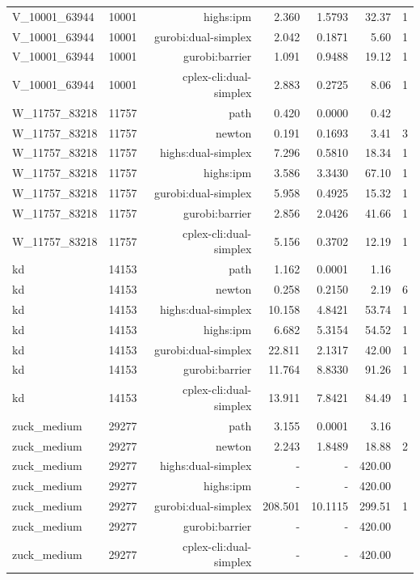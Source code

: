 \begin{longtable}{lrrrrrr}
V\_10001\_63944 & 10001 & highs:ipm & 2.360 & 1.5793 & 32.37 & 1 \\
V\_10001\_63944 & 10001 & gurobi:dual-simplex & 2.042 & 0.1871 & 5.60 & 1 \\
V\_10001\_63944 & 10001 & gurobi:barrier & 1.091 & 0.9488 & 19.12 & 1 \\
V\_10001\_63944 & 10001 & cplex-cli:dual-simplex & 2.883 & 0.2725 & 8.06 & 1 \\
W\_11757\_83218 & 11757 & path & 0.420 & 0.0000 & 0.42 &  \\
W\_11757\_83218 & 11757 & newton & 0.191 & 0.1693 & 3.41 & 3 \\
W\_11757\_83218 & 11757 & highs:dual-simplex & 7.296 & 0.5810 & 18.34 & 1 \\
W\_11757\_83218 & 11757 & highs:ipm & 3.586 & 3.3430 & 67.10 & 1 \\
W\_11757\_83218 & 11757 & gurobi:dual-simplex & 5.958 & 0.4925 & 15.32 & 1 \\
W\_11757\_83218 & 11757 & gurobi:barrier & 2.856 & 2.0426 & 41.66 & 1 \\
W\_11757\_83218 & 11757 & cplex-cli:dual-simplex & 5.156 & 0.3702 & 12.19 & 1 \\
kd & 14153 & path & 1.162 & 0.0001 & 1.16 &  \\
kd & 14153 & newton & 0.258 & 0.2150 & 2.19 & 6 \\
kd & 14153 & highs:dual-simplex & 10.158 & 4.8421 & 53.74 & 1 \\
kd & 14153 & highs:ipm & 6.682 & 5.3154 & 54.52 & 1 \\
kd & 14153 & gurobi:dual-simplex & 22.811 & 2.1317 & 42.00 & 1 \\
kd & 14153 & gurobi:barrier & 11.764 & 8.8330 & 91.26 & 1 \\
kd & 14153 & cplex-cli:dual-simplex & 13.911 & 7.8421 & 84.49 & 1 \\
zuck\_medium & 29277 & path & 3.155 & 0.0001 & 3.16 &  \\
zuck\_medium & 29277 & newton & 2.243 & 1.8489 & 18.88 & 2 \\
zuck\_medium & 29277 & highs:dual-simplex & - & - & 420.00 &  \\
zuck\_medium & 29277 & highs:ipm & - & - & 420.00 &  \\
zuck\_medium & 29277 & gurobi:dual-simplex & 208.501 & 10.1115 & 299.51 & 1 \\
zuck\_medium & 29277 & gurobi:barrier & - & - & 420.00 &  \\
zuck\_medium & 29277 & cplex-cli:dual-simplex & - & - & 420.00 &  \\

\end{longtable}
